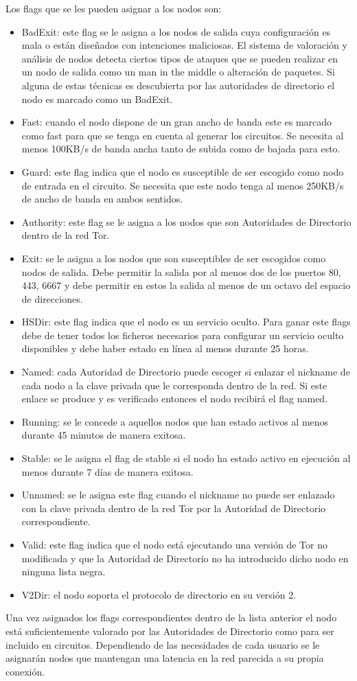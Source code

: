 Los flags que se les pueden asignar a los nodos son:
\begin{itemize}
	\item BadExit: este flag se le asigna a los nodos de salida cuya configuración es mala o están diseñados con intenciones maliciosas. El sistema de valoración y análisis de nodos detecta ciertos tipos de ataques que se pueden realizar en un nodo de salida como un man in the middle o alteración de paquetes. Si alguna de estas técnicas es descubierta por las autoridades de directorio el nodo es marcado como un BadExit.
	\item Fast: cuando el nodo dispone de un gran ancho de banda este es marcado como fast para que se tenga en cuenta al generar los circuitos. Se necesita al menos 100KB/s de banda ancha tanto de subida como de bajada para esto.
	\item Guard: este flag indica que el nodo es susceptible de ser escogido como nodo de entrada en el circuito. Se necesita que este nodo tenga al menos 250KB/s de ancho de banda en ambos sentidos.
	\item Authority: este flag se le asigna a los nodos que son Autoridades de Directorio dentro de la red Tor.
	\item Exit: se le asigna a los nodos que son susceptibles de ser escogidos como nodos de salida. Debe permitir la salida por al menos dos de los puertos 80, 443, 6667 y debe permitir en estos la salida al menos de un octavo del espacio de direcciones.
	\item HSDir: este flag indica que el nodo es un servicio oculto. Para ganar este flags debe de tener todos los ficheros necesarios para configurar un servicio oculto disponibles y debe haber estado en línea al menos durante 25 horas.
	\item Named: cada Autoridad de Directorio puede escoger si enlazar el nickname de cada nodo a la clave privada que le corresponda dentro de la red. Si este enlace se produce y es verificado entonces el nodo recibirá el flag named.
	\item Running: se le concede a aquellos nodos que han estado activos al menos durante 45 minutos de manera exitosa.
	\item Stable: se le asigna el flag de stable si el nodo ha estado activo en ejecución al menos durante 7 días de manera exitosa.
	\item Unnamed: se le asigna este flag cuando el nickname no puede ser enlazado con la clave privada dentro de la red Tor por la Autoridad de Directorio correspondiente.
	\item Valid: este flag indica que el nodo está ejecutando una versión de Tor no modificada y que la Autoridad de Directorio no ha introducido dicho nodo en ninguna lista negra.
	\item V2Dir: el nodo soporta el protocolo de directorio en su versión 2.
\end{itemize}

Una vez asignados los flags correspondientes dentro de la lista anterior el nodo está suficientemente valorado por las Autoridades de Directorio como para ser incluido en circuitos. Dependiendo de las necesidades de cada usuario se le asignarán nodos que mantengan una latencia en la red parecida a su propia conexión.
